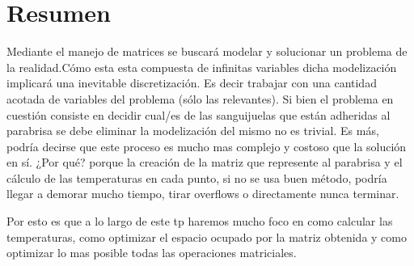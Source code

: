 \section{Resumen}

Mediante el manejo de matrices se buscará modelar y solucionar un problema de la realidad.Cómo esta esta compuesta de infinitas variables dicha modelización implicará una inevitable discretización. Es decir trabajar con una cantidad acotada de variables del problema (sólo las relevantes).
Si bien el problema en cuestión consiste en decidir cual/es de las sanguijuelas que están adheridas al parabrisa se debe eliminar la modelización del mismo no es trivial. Es más, podría decirse que este proceso es mucho mas complejo y costoso que la solución en sí. ¿Por qué? porque la creación de la matriz que represente al parabrisa y el cálculo de las temperaturas en cada punto, si no se usa buen método, podría llegar a demorar mucho tiempo, tirar overflows o directamente nunca terminar.

Por esto es que a lo largo de este tp haremos mucho foco en como calcular las temperaturas, como optimizar el espacio ocupado por la matriz obtenida y como optimizar lo mas posible todas las operaciones matriciales.



